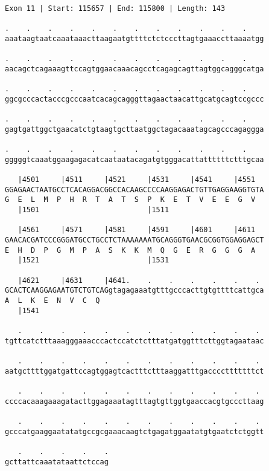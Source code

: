 \documentclass{article}
\begin{document}
\begin{Verbatim}
Exon 11 | Start: 115657 | End: 115800 | Length: 143
 
.    .    .    .    .    .    .    .    .    .    .    .    
aaataagtaatcaaataaacttaagaatgttttctctcccttagtgaaaccttaaaatgg
  
.    .    .    .    .    .    .    .    .    .    .    .    
aacagctcagaaagttccagtggaacaaacagcctcagagcagttagtggcagggcatga
  
.    .    .    .    .    .    .    .    .    .    .    .    
ggcgcccactacccgcccaatcacagcagggttagaactaacattgcatgcagtccgccc
  
.    .    .    .    .    .    .    .    .    .    .    .    
gagtgattggctgaacatctgtaagtgcttaatggctagacaaatagcagcccagaggga
  
.    .    .    .    .    .    .    .    .    .    .    .    
gggggtcaaatggaagagacatcaataatacagatgtgggacattattttttctttgcaa
  
   |4501     |4511     |4521     |4531     |4541     |4551  
GGAGAACTAATGCCTCACAGGACGGCCACAAGCCCCAAGGAGACTGTTGAGGAAGGTGTA
G  E  L  M  P  H  R  T  A  T  S  P  K  E  T  V  E  E  G  V  
   |1501                         |1511                      
  
   |4561     |4571     |4581     |4591     |4601     |4611  
GAACACGATCCCGGGATGCCTGCCTCTAAAAAAATGCAGGGTGAACGCGGTGGAGGAGCT
E  H  D  P  G  M  P  A  S  K  K  M  Q  G  E  R  G  G  G  A  
   |1521                         |1531                      
  
   |4621     |4631     |4641.    .    .    .    .    .    . 
GCACTCAAGGAGAATGTCTGTCAGgtagagaaatgtttgcccacttgtgttttcattgca
A  L  K  E  N  V  C  Q                                      
   |1541                                                    
  
   .    .    .    .    .    .    .    .    .    .    .    . 
tgttcatctttaaagggaaacccactccatctctttatgatggtttcttggtagaataac
  
   .    .    .    .    .    .    .    .    .    .    .    . 
aatgcttttggatgattccagtggagtcactttctttaaggatttgacccctttttttct
  
   .    .    .    .    .    .    .    .    .    .    .    . 
ccccacaaagaaagatacttggagaaatagtttagtgttggtgaaccacgtgcccttaag
  
   .    .    .    .    .    .    .    .    .    .    .    . 
gcccatgaaggaatatatgccgcgaaacaagtctgagatggaatatgtgaatctctggtt
  
   .    .    .    .    .
gcttattcaaatataattctccag
\end{Verbatim}
\end{document}
